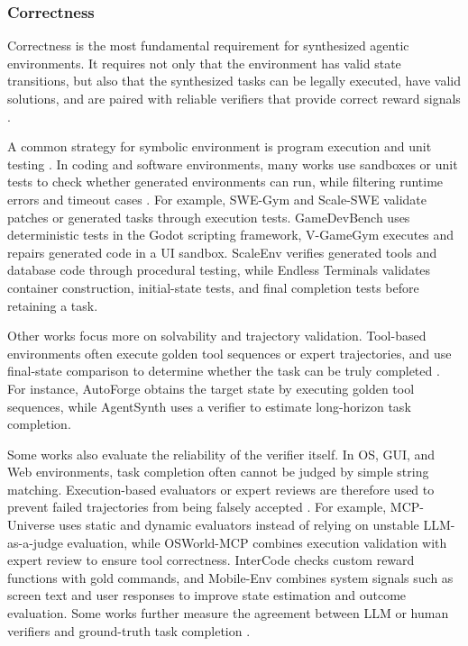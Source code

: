 \documentclass{llmxive}
\begin{document}
\subsubsection{Correctness}

Correctness is the most fundamental requirement for synthesized agentic environments. It requires not only that the environment has valid state transitions, but also that the synthesized tasks can be legally executed, have valid solutions, and are paired with reliable verifiers that provide correct reward signals \cite{SWE-smith, R2E-Gym, CLI-Gym}.

A common strategy for symbolic environment is program execution and unit testing \cite{SWE-Hub}. In coding and software environments, many works use sandboxes or unit tests to check whether generated environments can run, while filtering runtime errors and timeout cases \cite{SWE-Universe, SWE-Hub, MCP-Universe}. For example, SWE-Gym \cite{SWE-Gym} and Scale-SWE \cite{Scale-SWE} validate patches or generated tasks through execution tests. GameDevBench \cite{GameDevBench} uses deterministic tests in the Godot scripting framework, V-GameGym \cite{V-GameGym} executes and repairs generated code in a UI sandbox. ScaleEnv \cite{ScaleEnv} verifies generated tools and database code through procedural testing, while Endless Terminals \cite{Endless_Terminals} validates container construction, initial-state tests, and final completion tests before retaining a task.

Other works focus more on solvability and trajectory validation. Tool-based environments often execute golden tool sequences or expert trajectories, and use final-state comparison to determine whether the task can be truly completed \cite{Agent2World, SciAgentGym, AgentGen}. For instance, AutoForge \cite{AutoForge} obtains the target state by executing golden tool sequences, while AgentSynth \cite{AgentSynth} uses a verifier to estimate long-horizon task completion.

Some works also evaluate the reliability of the verifier itself. In OS, GUI, and Web environments, task completion often cannot be judged by simple string matching. Execution-based evaluators or expert reviews are therefore used to prevent failed trajectories from being falsely accepted \cite{OSWorld-MCP, EnvScaler, AutoWebWorld}. For example, MCP-Universe \cite{MCP-Universe} uses static and dynamic evaluators instead of relying on unstable LLM-as-a-judge evaluation, while OSWorld-MCP \cite{OSWorld-MCP} combines execution validation with expert review to ensure tool correctness. InterCode \cite{InterCode} checks custom reward functions with gold commands, and Mobile-Env \cite{Mobile-Env} combines system signals such as screen text and user responses to improve state estimation and outcome evaluation. Some works further measure the agreement between LLM or human verifiers and ground-truth task completion \cite{AgentSynth, Terminal-Bench, SciAgentGym}.
\end{document}

